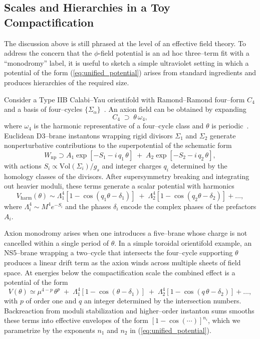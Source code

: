 \documentclass[a4paper,11pt]{article}
\begin{document}
\subsection{Scales and Hierarchies in a Toy Compactification}
\label{sec:toy_uv}

The discussion above is still phrased at the level of an effective field theory. To address the concern that the $\phi$-field potential is an ad hoc three–term fit with a ``monodromy'' label, it is useful to sketch a simple ultraviolet setting in which a potential of the form (\ref{eq:unified_potential}) arises from standard ingredients and produces hierarchies of the required size.

Consider a Type IIB Calabi–Yau orientifold with Ramond–Ramond four–form $C_4$ and a basis of four–cycles $\{\Sigma_{\alpha}\}$~\cite{GKP, KKLT}. An axion field can be obtained by expanding
\begin{equation}
    C_4 \;\supset\; \theta\,\omega_4,
\end{equation}
where $\omega_4$ is the harmonic representative of a four–cycle class and $\theta$ is periodic~\cite{Svrcek_Witten}. Euclidean D3–brane instantons wrapping rigid divisors $\Sigma_1$ and $\Sigma_2$ generate nonperturbative contributions to the superpotential of the schematic form
\begin{equation}
    W_{\text{np}} \supset A_1 \exp\!\left[-S_1 - i\,q_1\,\theta\right] \;+\; A_2 \exp\!\left[-S_2 - i\,q_2\,\theta\right],
\end{equation}
with actions $S_i \propto \text{Vol}(\Sigma_i) / g_s$ and integer charges $q_i$ determined by the homology classes of the divisors. After supersymmetry breaking and integrating out heavier moduli, these terms generate a scalar potential with harmonics
\begin{equation}
    V_{\text{harm}}(\theta) \sim \Lambda_1^4 \left[1 - \cos(q_1 \theta - \delta_1)\right] \;+\; \Lambda_2^4 \left[1 - \cos(q_2 \theta - \delta_2)\right] + \ldots,
\end{equation}
where $\Lambda_i^4 \sim M^4 e^{-S_i}$ and the phases $\delta_i$ encode the complex phases of the prefactors $A_i$.

Axion monodromy arises when one introduces a five–brane whose charge is not cancelled within a single period of $\theta$. In a simple toroidal orientifold example, an NS5–brane wrapping a two–cycle that intersects the four–cycle supporting $\theta$ produces a linear drift term as the axion winds across multiple sheets of field space. At energies below the compactification scale the combined effect is a potential of the form
\begin{equation}
    V(\theta) \simeq \mu^{4-p}\,\theta^{p} \;+\; \Lambda_1^4 \left[1 - \cos(\theta - \delta_1)\right] \;+\; \Lambda_2^4 \left[1 - \cos(q\,\theta - \delta_2)\right] + \ldots,
\end{equation}
with $p$ of order one and $q$ an integer determined by the intersection numbers. Backreaction from moduli stabilization and higher–order instanton sums smooths these terms into effective envelopes of the form $[1 - \cos(\cdots)]^{n_i}$, which we parametrize by the exponents $n_1$ and $n_2$ in (\ref{eq:unified_potential}).
\end{document}
